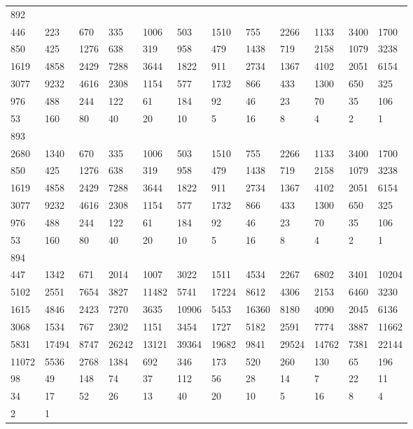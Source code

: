 \begin{longtable}{llllllllllll}
892&&&&&&&&&&&\\
446& 223& 670& 335& 1006& 503& 1510& 755& 2266& 1133& 3400& 1700\\
850& 425& 1276& 638& 319& 958& 479& 1438& 719& 2158& 1079& 3238\\
1619& 4858& 2429& 7288& 3644& 1822& 911& 2734& 1367& 4102& 2051& 6154\\
3077& 9232& 4616& 2308& 1154& 577& 1732& 866& 433& 1300& 650& 325\\
976& 488& 244& 122& 61& 184& 92& 46& 23& 70& 35& 106\\
53& 160& 80& 40& 20& 10& 5& 16& 8& 4& 2& 1\\

893&&&&&&&&&&&\\
2680& 1340& 670& 335& 1006& 503& 1510& 755& 2266& 1133& 3400& 1700\\
850& 425& 1276& 638& 319& 958& 479& 1438& 719& 2158& 1079& 3238\\
1619& 4858& 2429& 7288& 3644& 1822& 911& 2734& 1367& 4102& 2051& 6154\\
3077& 9232& 4616& 2308& 1154& 577& 1732& 866& 433& 1300& 650& 325\\
976& 488& 244& 122& 61& 184& 92& 46& 23& 70& 35& 106\\
53& 160& 80& 40& 20& 10& 5& 16& 8& 4& 2& 1\\

894&&&&&&&&&&&\\
447& 1342& 671& 2014& 1007& 3022& 1511& 4534& 2267& 6802& 3401& 10204\\
5102& 2551& 7654& 3827& 11482& 5741& 17224& 8612& 4306& 2153& 6460& 3230\\
1615& 4846& 2423& 7270& 3635& 10906& 5453& 16360& 8180& 4090& 2045& 6136\\
3068& 1534& 767& 2302& 1151& 3454& 1727& 5182& 2591& 7774& 3887& 11662\\
5831& 17494& 8747& 26242& 13121& 39364& 19682& 9841& 29524& 14762& 7381& 22144\\
11072& 5536& 2768& 1384& 692& 346& 173& 520& 260& 130& 65& 196\\
98& 49& 148& 74& 37& 112& 56& 28& 14& 7& 22& 11\\
34& 17& 52& 26& 13& 40& 20& 10& 5& 16& 8& 4\\
2& 1& \\


\end{longtable}
